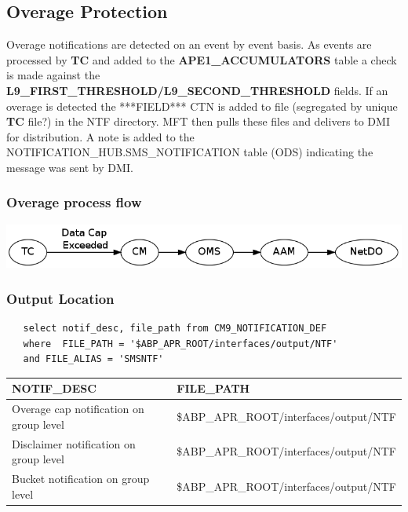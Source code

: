 \documentclass[12pt,twoside]{article}
\begin{document}
\subsection{Overage Protection}
\label{sec-3-7}

   Overage notifications are detected on an event by event basis. As events are processed by \textbf{TC} and added to 
   the \textbf{APE1\_ACCUMULATORS} table a check is made against the \textbf{L9\_FIRST\_THRESHOLD/L9\_SECOND\_THRESHOLD} fields. If an overage is detected the ***FIELD*** CTN is added to file (segregated by unique \textbf{TC} file?) in the NTF directory. MFT then pulls these files and delivers to DMI for distribution. A note is added to the NOTIFICATION\_HUB.SMS\_NOTIFICATION table (ODS) indicating the message was sent by DMI.
\subsubsection{Overage process flow}
\label{sec-3-7-1}

   \includegraphics[width=15cm]{Pictures/overage.png}
\subsubsection{Output Location}
\label{sec-3-7-2}

\begin{verbatim}
   select notif_desc, file_path from CM9_NOTIFICATION_DEF
   where  FILE_PATH = '$ABP_APR_ROOT/interfaces/output/NTF'
   and FILE_ALIAS = 'SMSNTF'
\end{verbatim}
\footnotesize

\begin{center}
\begin{tabular}{ll}
\hline
 \textbf{NOTIF\_DESC}                     &  \textbf{FILE\_PATH}                     \\
\hline
 Overage cap notification on group level  &  \$ABP\_APR\_ROOT/interfaces/output/NTF  \\
 Disclaimer notification on group level   &  \$ABP\_APR\_ROOT/interfaces/output/NTF  \\
 Bucket notification on group level       &  \$ABP\_APR\_ROOT/interfaces/output/NTF  \\
\hline
\end{tabular}
\end{center}
\end{document}
